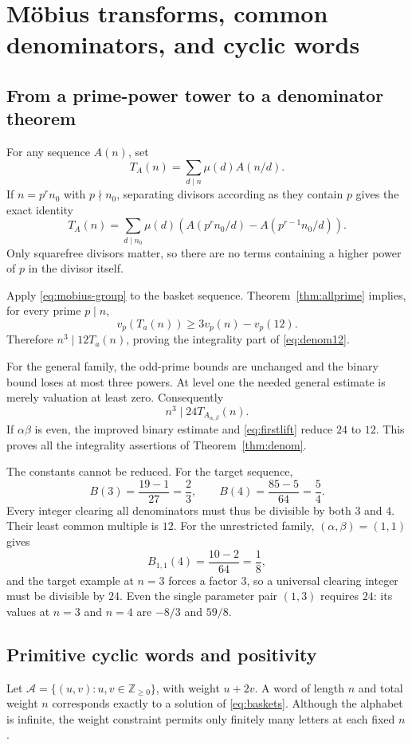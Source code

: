 \documentclass[11pt,a4paper]{article}
\numberwithin{equation}{section}
\theoremstyle{definition}
\theoremstyle{remark}
\newcommand{\Z}{\mathbb Z}
\newcommand{\A}{A_{\alpha,\beta}}
\begin{document}
\section{M\"obius transforms, common denominators, and cyclic words}
\label{sec:mobius}

\subsection{From a prime-power tower to a denominator theorem}
For any sequence $A(n)$, set
\[
 T_A(n)=\sum_{d\mid n}\mu(d)A(n/d).
\]
If $n=p^r n_0$ with $p\nmid n_0$, separating divisors according as they
contain $p$ gives the exact identity
\begin{equation}\label{eq:mobius-group}
 T_A(n)=\sum_{d\mid n_0}\mu(d)
 \left(A(p^r n_0/d)-A(p^{r-1}n_0/d)\right).
\end{equation}
Only squarefree divisors matter, so there are no terms containing a higher
power of $p$ in the divisor itself.

Apply \eqref{eq:mobius-group} to the basket sequence. Theorem~\ref{thm:allprime}
implies, for every prime $p\mid n$,
\[
 v_p(T_a(n))\ge3v_p(n)-v_p(12).
\]
Therefore $n^3\mid12T_a(n)$, proving the integrality part of
\eqref{eq:denom12}.

For the general family, the odd-prime bounds are unchanged and the binary
bound loses at most three powers. At level one the needed general estimate
is merely valuation at least zero. Consequently
\[
 n^3\mid24T_{\A}(n).
\]
If $\alpha\beta$ is even, the improved binary estimate and
\eqref{eq:firstlift} reduce $24$ to $12$. This proves all the integrality
assertions of Theorem~\ref{thm:denom}.

The constants cannot be reduced. For the target sequence,
\begin{equation}\label{eq:denom-sharp}
 B(3)=\frac{19-1}{27}=\frac23,
 \qquad B(4)=\frac{85-5}{64}=\frac54.
\end{equation}
Every integer clearing all denominators must thus be divisible by both $3$
and $4$. Their least common multiple is $12$. For the unrestricted family,
$(\alpha,\beta)=(1,1)$ gives
\[
 B_{1,1}(4)=\frac{10-2}{64}=\frac18,
\]
and the target example at $n=3$ forces a factor $3$, so a universal clearing
integer must be divisible by $24$. Even the single parameter pair $(1,3)$
requires $24$: its values at $n=3$ and $n=4$ are $-8/3$ and $59/8$.

\subsection{Primitive cyclic words and positivity}
Let $\mathcal A=\{(u,v):u,v\in\Z_{\ge0}\}$, with weight $u+2v$.
A word of length $n$ and total weight $n$ corresponds exactly to a solution
of \eqref{eq:baskets}. Although the alphabet is infinite, the weight
constraint permits only finitely many letters at each fixed $n$.
\end{document}
